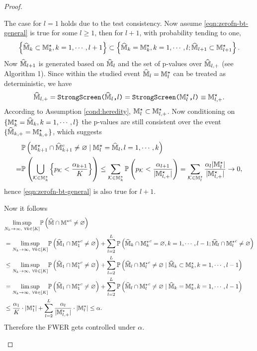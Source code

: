 \documentclass[12pt]{article}
\begin{document}
\begin{proof}
\begin{enumerate}
    The case for $l=1$ holds due to the test consistency. Now assume \eqref{eqn:zerofn-bt-general} is true for some $l\ge1$, then for $l+1$, with probability tending to one,
    \begin{align}
        \left\{\widehat{{\mathbb{M}}}_k\subset{\mathbb{M}}^\star_k, k=1,\cdots,l+1\right\}\subset\left\{\widehat{{\mathbb{M}}}_k={\mathbb{M}}^\star_k, k=1,\cdots,l; \widehat{{\mathbb{M}}}_{l+1}\subset{\mathbb{M}}^\star_{l+1}\right\}.
    \end{align}
    Now $\widehat{{\mathbb{M}}}_{l+1}$ is generated based on $\widehat{{\mathbb{M}}}_{l}$ and the set of p-values over $\widehat{{\mathbb{M}}}_{l,+}$ (see Algorithm 1). Since within the studied event $\widehat{{\mathbb{M}}}_{l}={\mathbb{M}}^\star_l$ can be treated as deterministic, we have 
    \[
    \widehat{{\mathbb{M}}}_{l,+} = \texttt{StrongScreen($\widehat{{\mathbb{M}}}_l$,$l$)} = \texttt{StrongScreen(${{\mathbb{M}}}^\star_l$,$l$)} \equiv {\mathbb{M}}^\star_{l,+}.
    \]
    According to Assumption \ref{cond:heredity}, ${\mathbb{M}}^\star_l\subset{\mathbb{M}}^\star_{l,+}$. Now conditioning on $\{{\mathbb{M}}^\star_k=\widehat{{\mathbb{M}}}_k, k=1,\cdots,l\}$ the p-values are still  consistent over the event $\{\widehat{{\mathbb{M}}}_{k,+}={\mathbb{M}}^\star_{k,+}\}$, which suggests
    \begin{align*}
        &{\mathbb{P}}\left({{\mathbb{M}}^\star_{k+1}}\cap{\widehat{{\mathbb{M}}}_{k+1}}^c\neq\varnothing\mid{\mathbb{M}}^\star_l=\widehat{{\mathbb{M}}}_l, l=1,\cdots,k\right)\notag\\
        =& {\mathbb{P}}\left(\bigcup_{{\mathcal{K}}\in {\mathbb{M}}^\star_{k}}\left\{p_{{\mathcal{K}}}<\frac{\alpha_{k+1}}{K}\right\}\right)
        \le \sum_{{\mathcal{K}}\in {\mathbb{M}}^\star_{k}}{\mathbb{P}}\left(p_{\mathcal{K}}<\frac{\alpha_{l+1}}{|{\mathbb{M}}^\star_{l,+}|}\right) =  \sum_{{\mathcal{K}}\in{\mathbb{M}}_{l}^\star}\frac{\alpha_l|{\mathbb{M}}_{l}^\star|}{|{\mathbb{M}}^\star_{l,+}|}\to 0,
    \end{align*}
    hence \eqref{eqn:zerofn-bt-general} is also true for $l+1$.
    
    
    Now it follows
    \begin{align}
    &\underset{N_k\to\infty,~\forall k\in[K]}{\lim\sup}{\mathbb{P}}\left(\widehat{{\mathbb{M}}}\cap{{\mathbb{M}}^\star}^c\neq \varnothing\right) \notag\\
    &= \underset{N_k\to\infty,~\forall k\in[K]}{\lim\sup}{\mathbb{P}}\left(\widehat{{\mathbb{M}}}_1\cap{{\mathbb{M}}^\star_1}^c\neq\varnothing\right) 
    + 
    \sum_{l=2}^L {\mathbb{P}}\left(\widehat{{\mathbb{M}}}_k\cap{{\mathbb{M}}^\star_k}^c=\varnothing,k=1,\cdots,l-1; \widehat{{\mathbb{M}}}_l\cap{{\mathbb{M}}^\star_l}^c\neq\varnothing\right)\notag\\
    &\le
    \underset{N_k\to\infty,~\forall k\in[K]}{\lim\sup}{\mathbb{P}}\left(\widehat{{\mathbb{M}}}_1\cap{{\mathbb{M}}^\star_1}^c\neq\varnothing\right) 
    + 
    \sum_{l=2}^L {\mathbb{P}}\left( \widehat{{\mathbb{M}}}_l\cap{{\mathbb{M}}^\star_l}^c\neq\varnothing\mid\widehat{{\mathbb{M}}}_k\subset{\mathbb{M}}^\star_k, k=1,\cdots,l-1\right)\notag\\
    &=
    \underset{N_k\to\infty,~\forall k\in[K]}{\lim\sup}{\mathbb{P}}\left(\widehat{{\mathbb{M}}}_1\cap{{\mathbb{M}}^\star_1}^c\neq\varnothing\right) 
    + 
    \sum_{l=2}^L {\mathbb{P}}\left( \widehat{{\mathbb{M}}}_l\cap{{\mathbb{M}}^\star_l}^c\neq\varnothing\mid\widehat{{\mathbb{M}}}_k ={\mathbb{M}}^\star_k,k=1,\cdots,l-1\right)\notag\\
    &\le 
    \frac{\alpha_1}{K}\cdot|{\mathbb{M}}_1^\star| + \sum_{l=2}^L \frac{\alpha_l}{|{\mathbb{M}}^\star_{l,+}|}\cdot|{\mathbb{M}}^\star_l| \le \alpha. \label{eqn:fwer-bt-general}
    \end{align}
Therefore the FWER gets controlled under $\alpha$.


\end{enumerate}
\end{proof}
\end{document}
